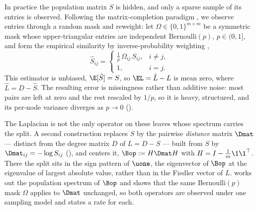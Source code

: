 In practice the population matrix $S$ is hidden, and only a sparse sample of its
entries is observed. Following the matrix-completion paradigm
\cite{candes2009power, candes2008exact}, we observe entries through a random mask
and reweight: let $\Omega\in\{0,1\}^{m\times m}$ be a symmetric mask whose
upper-triangular entries are independent $\mathrm{Bernoulli}(p)$, $p\in(0,1]$, and
form the empirical similarity by inverse-probability weighting
\cite{candes2009matrix},
\begin{equation}\label{eq:sampling_estimator}
   \hat S_{ij}=\begin{cases}\tfrac1p\,\Omega_{ij}\,S_{ij}, & i\ne j,\\ 1, & i=j.\end{cases}
\end{equation}
This estimator is unbiased, $\E[\hat S]=S$, so $\EL=\hat L-L$ is mean zero, where
$\hat L=\hat D-\hat S$. The resulting error is missingness rather than additive
noise: most pairs are left at zero and the rest rescaled by $1/p$, so it is heavy,
structured, and its per-node variance diverges as $p\to0$ ().

The Laplacian is not the only operator on these leaves whose spectrum carries
the split. A second construction replaces $S$ by the pairwise \emph{distance}
matrix $\Dmat$ --- distinct from the degree matrix $D$ of $L=D-S$ --- built
from $S$ by $\Dmat_{ij}=-\log S_{ij}$ (), and centers it,
$\Bop:=H\Dmat H$ with $H=I-\tfrac1m\1\1^\top$. There the split sits in the sign
pattern of $\uone$, the eigenvector of $\Bop$ at the eigenvalue of largest
absolute value, rather than in the Fiedler vector of $L$.  works
out the population spectrum of $\Bop$ and shows that the same
$\mathrm{Bernoulli}(p)$ mask $\Omega$ applies to $\Dmat$
unchanged, so both operators are observed under one sampling model and
 states a rate for each.

